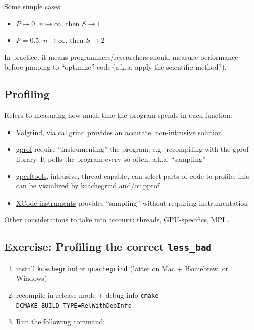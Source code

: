 Some simple cases:

\begin{itemize}
\itemsep1pt\parskip0pt
\item
  $P \mapsto 0$, $n \mapsto \infty$, then $S \rightarrow 1$
\item
  $P=0.5$, $n \mapsto \infty$, then $S \rightarrow 2$
\end{itemize}

In practice, it means programmers/researchers should measure performance
before jumping to ``optimize'' code (a.k.a. apply the scientific
method?).

\subsection{Profiling}\label{profiling}

Refers to measuring how much time the program spends in each function:

\begin{itemize}
\itemsep1pt\parskip0pt
\item
  Valgrind, via
  \href{http://valgrind.org/docs/manual/cl-manual.html}{callgrind}
  provides an accurate, non-intrusive solution
\item
  \href{https://sourceware.org/binutils/docs/gprof/}{gprof} require
  ``instrumenting'' the program, e.g.~recompiling with the gprof
  library. It polls the program every so often, a.k.a. ``sampling''
\item
  \href{{[}https://github.com/gperftools/gperftools}{gperftools},
  intrusive, thread-capable, can select parts of code to profile, info
  can be visualized by kcachegrind and/or
  \href{https://github.com/google/pprof}{pprof}
\item
  \href{https://developer.apple.com/library/content/documentation/DeveloperTools/Conceptual/InstrumentsUserGuide/}{XCode
  instruments} provides ``sampling'' without requiring instrumentation
\end{itemize}

Other considerations to take into account: threads, GPU-specifics,
MPI\ldots{}

\subsection{Exercise: Profiling the correct
\texttt{less\_bad}}\label{exercise-profiling-the-correct-lessux5fbad}

\begin{enumerate}
\def\labelenumi{\arabic{enumi}.}
\itemsep1pt\parskip0pt
\item
  install \texttt{kcachegrind} or \texttt{qcachegrind} (latter on Mac +
  Homebrew, or Windows)
\item
  recompile in release mode + debug info
  \texttt{cmake -DCMAKE\_BUILD\_TYPE=RelWithDebInfo}
\item
  Run the following command:
\end{enumerate}

